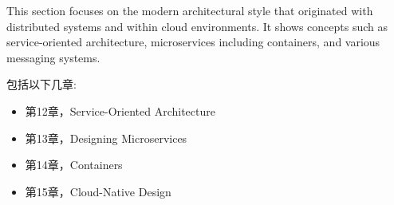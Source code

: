 
This section focuses on the modern architectural style that originated with distributed systems and within cloud environments. It shows concepts such as service-oriented architecture, microservices including containers, and various messaging systems.


包括以下几章:

\begin{itemize}
\item 第12章，Service-Oriented Architecture 
\item 第13章，Designing Microservices
\item 第14章，Containers
\item 第15章，Cloud-Native Design 
\end{itemize}